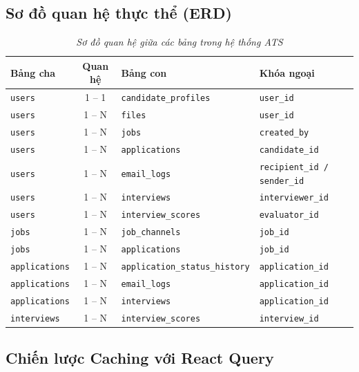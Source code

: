 \subsection{Sơ đồ quan hệ thực thể (ERD)}

\begin{table}[H]
    \centering
    \renewcommand{\arraystretch}{1.4}
    \begin{tabular}{|l|c|l|l|}
        \hline
        \textbf{Bảng cha} & \textbf{Quan hệ} & \textbf{Bảng con} & \textbf{Khóa ngoại} \\ \hline
        \texttt{users} & 1 -- 1 & \texttt{candidate\_profiles} & \texttt{user\_id} \\ \hline
        \texttt{users} & 1 -- N & \texttt{files} & \texttt{user\_id} \\ \hline
        \texttt{users} & 1 -- N & \texttt{jobs} & \texttt{created\_by} \\ \hline
        \texttt{users} & 1 -- N & \texttt{applications} & \texttt{candidate\_id} \\ \hline
        \texttt{users} & 1 -- N & \texttt{email\_logs} & \texttt{recipient\_id / sender\_id} \\ \hline
        \texttt{users} & 1 -- N & \texttt{interviews} & \texttt{interviewer\_id} \\ \hline
        \texttt{users} & 1 -- N & \texttt{interview\_scores} & \texttt{evaluator\_id} \\ \hline
        \texttt{jobs} & 1 -- N & \texttt{job\_channels} & \texttt{job\_id} \\ \hline
        \texttt{jobs} & 1 -- N & \texttt{applications} & \texttt{job\_id} \\ \hline
        \texttt{applications} & 1 -- N & \texttt{application\_status\_history} & \texttt{application\_id} \\ \hline
        \texttt{applications} & 1 -- N & \texttt{email\_logs} & \texttt{application\_id} \\ \hline
        \texttt{applications} & 1 -- N & \texttt{interviews} & \texttt{application\_id} \\ \hline
        \texttt{interviews} & 1 -- N & \texttt{interview\_scores} & \texttt{interview\_id} \\ \hline
    \end{tabular}
    \caption{\textit{Sơ đồ quan hệ giữa các bảng trong hệ thống ATS}}
    \label{tab:erd}
\end{table}

\subsection{Chiến lược Caching với React Query}

